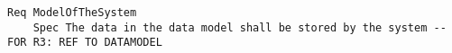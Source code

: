 

\begin{lstlisting}
Req ModelOfTheSystem
	Spec The data in the data model shall be stored by the system --FOR R3: REF TO DATAMODEL

\end{lstlisting}